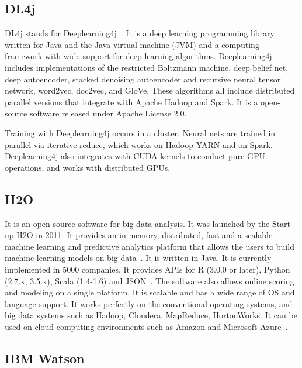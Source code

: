 \subsection{DL4j}

DL4j stands for Deeplearning4j~\cite{www-dl4j}. It is a deep learning
programming library written for Java and the Java virtual machine
(JVM) and a computing framework with wide support for deep learning
algorithms. Deeplearning4j includes implementations of the restricted
Boltzmann machine, deep belief net, deep autoencoder, stacked
denoising autoencoder and recursive neural tensor network, word2vec,
doc2vec, and GloVe. These algorithms all include distributed parallel
versions that integrate with Apache Hadoop and Spark. It is a
open-source software released under Apache License 2.0.

    Training with Deeplearning4j occurs in a cluster. Neural nets are
    trained in parallel via iterative reduce, which works on
    Hadoop-YARN and on Spark. Deeplearning4j also integrates with CUDA
    kernels to conduct pure GPU operations, and works with distributed
    GPUs.
	
\subsection{H2O}

It is an open source software for big data analysis. It was launched
by the Start-up H2O in 2011. It provides an in-memory, distributed,
fast and a scalable machine learning and predictive analytics platform
that allows the users to build machine learning models on big
data~\cite{www-H2O-website}. It is written in Java. It is currently
implemented in 5000 companies. It provides APIs for R (3.0.0 or
later), Python (2.7.x, 3.5.x), Scala (1.4-1.6) and
JSON~\cite{www-H2O-book}. The software also allows online scoring and
modeling on a single platform.  It is scalable and has a wide range of
OS and language support. It works perfectly on the conventional
operating systems, and big data systems such as Hadoop, Cloudera,
MapReduce, HortonWorks.  It can be used on cloud computing
environments such as Amazon and Microsoft Azure~\cite{www-H2O-wiki}.


\subsection{IBM Watson \cv}


